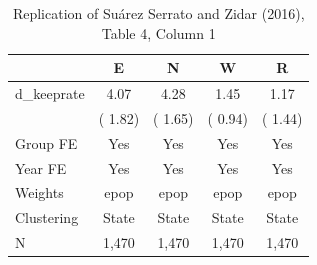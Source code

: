 \begin{table}[htbp]
\centering
\caption{Replication of Su\'{a}rez Serrato and Zidar (2016), Table 4, Column 1}
\label{tab:ssz_t4c1}
\begin{tabular}{lcccc}
\hline\hline
 & E & N & W & R \\
\hline
d\_keeprate &      4.07 &      4.28 &      1.45 &      1.17 \\
 & (     1.82) & (     1.65) & (     0.94) & (     1.44) \\
\hline
Group FE & Yes & Yes & Yes & Yes \\
Year FE & Yes & Yes & Yes & Yes \\
Weights & epop & epop & epop & epop \\
Clustering & State & State & State & State \\
N &     1,470 &     1,470 &     1,470 &     1,470 \\
\hline\hline
\end{tabular}
\end{table}
